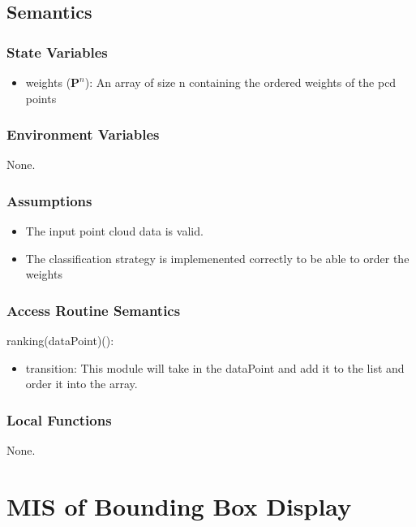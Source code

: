 \documentclass[12pt, titlepage]{article}
\begin{document}
\subsection{Semantics}

\subsubsection{State Variables}

\begin{itemize}
  \item weights ($\mathbf{P}^{n}$): An array of size n containing the ordered weights of the pcd points
\end{itemize}

\subsubsection{Environment Variables}

None.

\subsubsection{Assumptions}

\begin{itemize}
  \item The input point cloud data is valid.
  \item The classification strategy is implemenented correctly to be able to order the weights
\end{itemize}

\subsubsection{Access Routine Semantics}

\noindent ranking(dataPoint)():
\begin{itemize}
  \item transition: This module will take in the dataPoint and add it to the list and order it into the array.
\end{itemize}

\subsubsection{Local Functions}

None.
\newpage


\section{MIS of Bounding Box Display} \label{ModuleBBD} 
\end{document}
